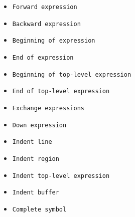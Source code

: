 \begin{itemize}
\item \texttt{Forward expression}
\item \texttt{Backward expression}
\item \texttt{Beginning of expression}
\item \texttt{End of expression}
\item \texttt{Beginning of top-level expression}
\item \texttt{End of top-level expression}
\item \texttt{Exchange expressions}
\item \texttt{Down expression}
\item \texttt{Indent line}
\item \texttt{Indent region}
\item \texttt{Indent top-level expression}
\item \texttt{Indent buffer}
\item \texttt{Complete symbol}
\end{itemize}


